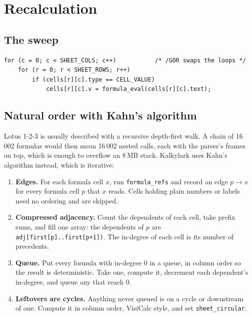 \documentclass[11pt]{article}
\begin{document}
\section{Recalculation}

\subsection{The sweep}

\begin{lstlisting}[style=c]
for (c = 0; c < SHEET_COLS; c++)           /* /GOR swaps the loops */
    for (r = 0; r < SHEET_ROWS; r++)
        if (cells[r][c].type == CELL_VALUE)
            cells[r][c].v = formula_eval(cells[r][c].text);
\end{lstlisting}

\subsection{Natural order with Kahn's algorithm}

Lotus 1-2-3 is usually described with a recursive depth-first walk. A
chain of 16\,002 formulas would then mean 16\,002 nested calls, each with
the parser's frames on top, which is enough to overflow an 8\,MB stack.
Kalkylark uses Kahn's algorithm instead, which is iterative:

\begin{enumerate}[label=\arabic*.]
\item \textbf{Edges.} For each formula cell \(x\), run
  \texttt{formula\_refs} and record an edge \(p \to x\) for every formula
  cell \(p\) that \(x\) reads. Cells holding plain numbers or labels need
  no ordering and are skipped.
\item \textbf{Compressed adjacency.} Count the dependents of each cell,
  take prefix sums, and fill one array: the dependents of \(p\) are
  \texttt{adj[first[p]..first[p+1])}. The in-degree of each cell is its
  number of precedents.
\item \textbf{Queue.} Put every formula with in-degree 0 in a queue, in
  column order so the result is deterministic. Take one, compute it,
  decrement each dependent's in-degree, and queue any that reach 0.
\item \textbf{Leftovers are cycles.} Anything never queued is on a cycle
  or downstream of one. Compute it in column order, VisiCalc style, and
  set \texttt{sheet\_circular}.
\end{enumerate}
\end{document}
